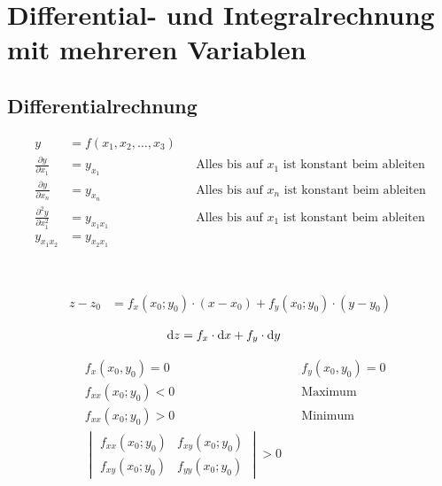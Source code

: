  
\section{Differential- und Integralrechnung mit mehreren Variablen}
\subsection{Differentialrechnung}

\begin{boxleft}
\end{boxleft}\begin{boxrightshaded}
\begin{align*}
y&=f(x_1,x_2,\dots,x_3)\\
\frac{\partial y}{\partial x_1}&=y_{x_1}&&\text{Alles bis auf $x_1$ ist konstant beim ableiten}\\
\frac{\partial y}{\partial x_n}&=y_{x_n}&&\text{Alles bis auf $x_n$ ist konstant beim ableiten}\\
\frac{\partial^2 y}{\partial x_1^2}&=y_{x_1x_1}&&\text{Alles bis auf $x_1$ ist konstant beim ableiten}\\
y_{x_1x_2}&=y_{x_2x_1}
\end{align*}
\end{boxrightshaded}

\begin{boxleft}
\\
\end{boxleft}\begin{boxrightshaded}
\begin{align*}
z-z_0&=f_x\left(x_0;y_0\right)\cdot\left(x-x_0\right)+f_y\left(x_0;y_0\right)\cdot\left(y-y_0\right)
\end{align*}
\end{boxrightshaded}

\begin{boxleft}
\end{boxleft}\begin{boxrightshaded}
\begin{align*}
\mathop{}\!\mathrm{d} z&=f_x\cdot\mathop{}\!\mathrm{d} x+f_y\cdot\mathop{}\!\mathrm{d} y
\end{align*}
\end{boxrightshaded}

\begin{boxleft}
\end{boxleft}\begin{boxrightshaded}
\begin{align*}
&f_x(x_0,y_0)=0&&f_y(x_0,y_0)=0\\
&f_{xx}(x_0;y_0)<0&&\text{Maximum}\\
&f_{xx}(x_0;y_0)>0&&\text{Minimum}\\
&\begin{vmatrix}f_{xx}(x_0;y_0)&f_{xy}(x_0;y_0)\\f_{xy}(x_0;y_0)&f_{yy}(x_0;y_0)\end{vmatrix}>0
\end{align*}
\end{boxrightshaded}


